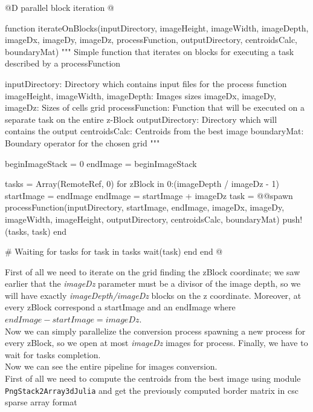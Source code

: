 \documentclass[11pt,oneside]{article}	%
\begin{document}
@D parallel block iteration
@{function iterateOnBlocks(inputDirectory,
                         imageHeight, imageWidth, imageDepth,
                         imageDx, imageDy, imageDz,
                         processFunction, outputDirectory,
                         centroidsCalc, boundaryMat)
  """
  Simple function that iterates on blocks for executing
  a task described by a processFunction

  inputDirectory: Directory which contains input files for the process function
  imageHeight, imageWidth, imageDepth: Images sizes
  imageDx, imageDy, imageDz: Sizes of cells grid
  processFunction: Function that will be executed on a separate task on
  the entire z-Block
  outputDirectory: Directory which will contains the output
  centroidsCalc: Centroids from the best image
  boundaryMat: Boundary operator for the chosen grid
  """

  beginImageStack = 0
  endImage = beginImageStack

  tasks = Array(RemoteRef, 0)
  for zBlock in 0:(imageDepth / imageDz - 1)
    startImage = endImage
    endImage = startImage + imageDz
    task = @@spawn processFunction(inputDirectory,
				   startImage, endImage,
                                   imageDx, imageDy,
                                   imageWidth, imageHeight,
                                   outputDirectory,
                                   centroidsCalc, boundaryMat)                                  
    push!(tasks, task)
  end

  # Waiting for tasks
  for task in tasks
    wait(task)
  end
end @}

First of all we need to iterate on the grid finding the zBlock coordinate; we saw earlier that the \textit{imageDz} parameter must be a divisor of the image depth, so we will have exactly \textit{imageDepth/imageDz} blocks on the z coordinate. Moreover, at every zBlock correspond a startImage and an endImage where $endImage - startImage = imageDz$.\\
Now we can simply parallelize the conversion process spawning a new process for every zBlock, so we open at most \textit{imageDz} images for process. Finally, we have to wait for tasks completion.\\

Now we can see the entire pipeline for images conversion.\\

First of all we need to compute the centroids from the best image using module \texttt{PngStack2Array3dJulia} and get the previously computed border matrix in csc sparse array format
\end{document}
